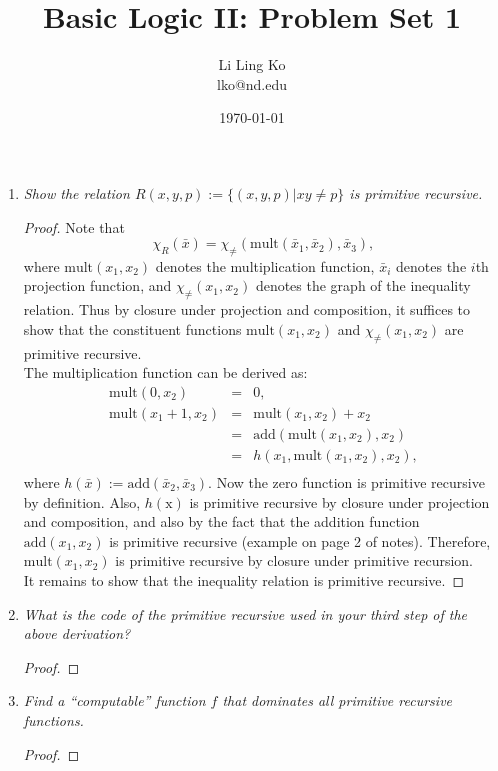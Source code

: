\documentclass{article}
\begin{document}
\title{Basic Logic II: Problem Set 1}
\author{Li Ling Ko\\ lko@nd.edu}
\date{\today}
\maketitle

\begin{enumerate}[label={\bf Q\arabic*:}]
  \item \it Show the relation $R(x,y,p):=\{(x,y,p)|xy\neq p\}$ is primitive
    recursive.

    \begin{proof}
      Note that
      \[\chi_R(\bar{x})=\chi_{\neq}(\text{mult}(\bar{x}_1,
        \bar{x}_2), \bar{x}_3),\]
      where $\text{mult}(x_1,x_2)$ denotes the multiplication function,
      $\bar{x}_i$ denotes the $i$th projection function, and
      $\chi_{\neq}(x_1,x_2)$ denotes the graph of the inequality relation.
      Thus by closure under projection and composition, it suffices to show
      that the constituent functions $\text{mult}(x_1,x_2)$ and
      $\chi_{\neq}(x_1,x_2)$ are primitive recursive. \\

      The multiplication function can be derived as:
      \[\begin{array}{lcl}
        \text{mult}(0,x_2) &= &0, \\
        \text{mult}(x_1+1,x_2) &= &\text{mult}(x_1,x_2)+x_2 \\
        &= &\text{add}(\text{mult}(x_1,x_2),x_2) \\
        &= &h(x_1,\text{mult}(x_1,x_2),x_2), \\
      \end{array}\]
      where $h(\bar{x}):=\text{add}(\bar{x}_2,\bar{x}_3)$. Now the zero
      function is primitive recursive by definition. Also, $h(\text{x})$ is
      primitive recursive by closure under projection and composition, and
      also by the fact that the addition function $\text{add}(x_1,x_2)$ is
      primitive recursive (example on page 2 of notes). Therefore,
      $\text{mult}(x_1,x_2)$ is primitive recursive by closure under
      primitive recursion. \\

      It remains to show that the inequality relation is primitive
      recursive.
    \end{proof}

  \item \it What is the code of the primitive recursive used in your third
    step of the above derivation?

    \begin{proof}
    \end{proof}

  \item \it Find a ``computable'' function $f$ that dominates all primitive
    recursive functions.

    \begin{proof}
    \end{proof}
\end{enumerate}
\end{document}
